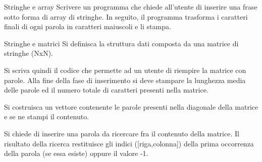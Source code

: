 \documentclass[aspectratio=169, ]{beamer}
\begin{document}

\begin{frame}{Stringhe e array}
    Scrivere un programma che chiede all'utente di inserire una frase sotto forma di array di stringhe.
    In seguito, il programma trasforma i caratteri finali di ogni parola in caratteri maiuscoli e li stampa.
\end{frame}

\begin{frame}{Stringhe e matrici}
Si definisca la struttura dati composta da una matrice di stringhe (NxN).

Si scriva quindi il codice che permette ad un utente di riempire la matrice con parole.
Alla fine della fase di inserimento si deve stampare la lunghezza media delle parole ed il numero
totale di caratteri presenti nella matrice.

Si costruisca un vettore contenente le parole presenti nella diagonale della matrice e se ne stampi
il contenuto.

Si chiede di inserire una parola da ricercare fra il contenuto della matrice. Il risultato della ricerca restituisce gli indici ([riga,colonna]) della prima occorrenza della parola (se essa esiste) oppure il valore -1.
\end{frame}
\end{document}
